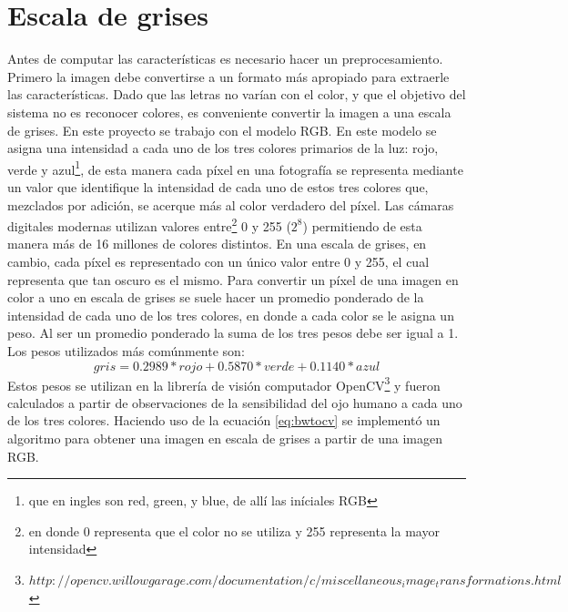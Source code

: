 \documentclass[a4paper, 11pt, oneside]{report}
\begin{document}
\section{Escala de grises}
Antes de computar las características es necesario hacer un preprocesamiento. Primero la imagen debe convertirse a un formato más apropiado para extraerle las características. Dado que las letras no varían con el color, y que el objetivo del sistema no es reconocer colores, es conveniente convertir la imagen a una escala de grises. En este proyecto se trabajo con el modelo RGB. En este modelo se asigna una intensidad a cada uno de los tres colores primarios de la luz: rojo, verde y azul\footnote{que en ingles son red, green, y blue, de allí las iníciales RGB}, de esta manera cada píxel en una fotografía se representa mediante un valor que identifique la intensidad de cada uno de estos tres colores que, mezclados por adición, se acerque más al color verdadero del píxel. Las cámaras digitales modernas utilizan valores entre\footnote{en donde 0 representa que el color no se utiliza y 255 representa la mayor intensidad} 0 y 255 ($2^8$) permitiendo de esta manera más de 16 millones de colores distintos. En una escala de grises, en cambio, cada píxel es representado con un único valor entre 0 y 255, el cual representa que tan oscuro es el mismo. Para convertir un píxel de una imagen en color a uno en escala de grises se suele hacer un promedio ponderado de la intensidad de cada uno de los tres colores, en donde a cada color se le asigna un peso. Al ser un promedio ponderado la suma de los tres pesos debe ser igual a 1. Los pesos utilizados más comúnmente son:
\begin{equation}\label{eq:bwtocv}
gris = 0.2989 * rojo + 0.5870 * verde + 0.1140 * azul 
\end{equation}
Estos pesos se utilizan en la librería de visión computador OpenCV\footnote{$http://opencv.willowgarage.com/documentation/c/miscellaneous_image_transformations.html$} y fueron calculados a partir de observaciones de la sensibilidad del ojo humano a cada uno de los tres colores. 
Haciendo uso de la ecuación \ref{eq:bwtocv} se implementó un algoritmo para obtener una imagen en escala de grises a partir de una imagen RGB. 
\end{document}
